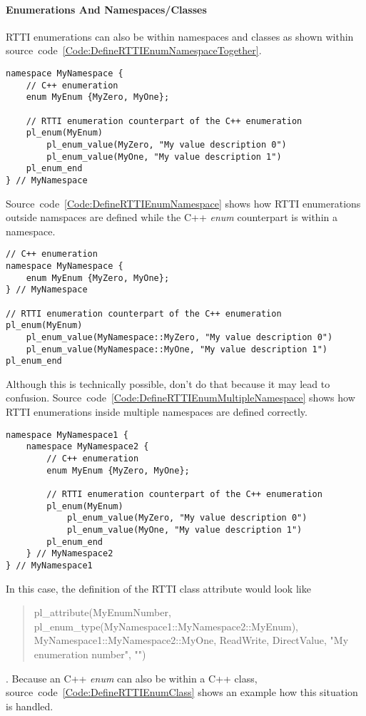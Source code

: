 \paragraph{Enumerations And Namespaces/Classes}
RTTI enumerations can also be within namespaces and classes as shown within source~code~\ref{Code:DefineRTTIEnumNamespaceTogether}.
\begin{lstlisting}[float=htb,label=Code:DefineRTTIEnumNamespaceTogether,caption={Defining a new RTTI enumeration within a namespace}]
namespace MyNamespace {
	// C++ enumeration
	enum MyEnum {MyZero, MyOne};

	// RTTI enumeration counterpart of the C++ enumeration
	pl_enum(MyEnum)
		pl_enum_value(MyZero, "My value description 0")
		pl_enum_value(MyOne, "My value description 1")
	pl_enum_end
} // MyNamespace
\end{lstlisting}
Source~code~\ref{Code:DefineRTTIEnumNamespace} shows how RTTI enumerations outside namspaces are defined while the C++ \emph{enum} counterpart is within a namespace.
\begin{lstlisting}[float=htb,label=Code:DefineRTTIEnumNamespace,caption={Defining a new RTTI enumeration with ugly mixed namespaces}]
// C++ enumeration
namespace MyNamespace {
	enum MyEnum {MyZero, MyOne};
} // MyNamespace

// RTTI enumeration counterpart of the C++ enumeration
pl_enum(MyEnum)
	pl_enum_value(MyNamespace::MyZero, "My value description 0")
	pl_enum_value(MyNamespace::MyOne, "My value description 1")
pl_enum_end
\end{lstlisting}
Although this is technically possible, don't do that because it may lead to confusion. Source~code~\ref{Code:DefineRTTIEnumMultipleNamespace} shows how RTTI enumerations inside multiple namespaces are defined correctly.
\begin{lstlisting}[label=Code:DefineRTTIEnumMultipleNamespace,caption={Defining a new RTTI enumeration within multiple namespaces}]
namespace MyNamespace1 {
	namespace MyNamespace2 {
		// C++ enumeration
		enum MyEnum {MyZero, MyOne};

		// RTTI enumeration counterpart of the C++ enumeration
		pl_enum(MyEnum)
			pl_enum_value(MyZero, "My value description 0")
			pl_enum_value(MyOne, "My value description 1")
		pl_enum_end
	} // MyNamespace2
} // MyNamespace1
\end{lstlisting}
In this case, the definition of the RTTI class attribute would look like \begin{quote}pl\_attribute(MyEnumNumber, pl\_enum\_type(MyNamespace1::MyNamespace2::MyEnum), MyNamespace1::MyNamespace2::MyOne, ReadWrite, DirectValue, "My enumeration number", "")\end{quote}. Because an C++ \emph{enum} can also be within a C++ class, source~code~\ref{Code:DefineRTTIEnumClass} shows an example how this situation is handled.
